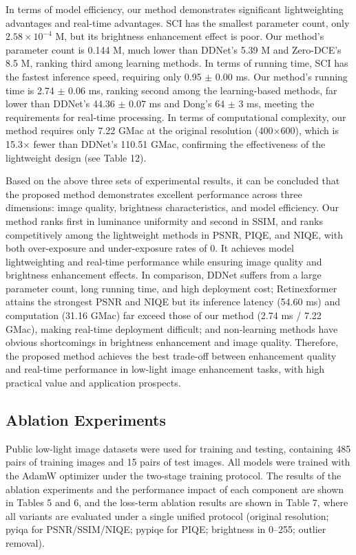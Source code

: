 \documentclass[sensors,article,submit,moreauthors]{Definitions/mdpi}
\begin{document}
In terms of model efficiency, our method demonstrates significant lightweighting advantages and real-time advantages. SCI has the smallest parameter count, only $2.58\times10^{-4}$ M, but its brightness enhancement effect is poor. Our method's parameter count is 0.144 M, much lower than DDNet's 5.39 M and Zero-DCE's 8.5 M, ranking third among learning methods. In terms of running time, SCI has the fastest inference speed, requiring only 0.95 $\pm$ 0.00 ms. Our method's running time is 2.74 $\pm$ 0.06 ms, ranking second among the learning-based methods, far lower than DDNet's 44.36 $\pm$ 0.07 ms and Dong's 64 $\pm$ 3 ms, meeting the requirements for real-time processing. In terms of computational complexity, our method requires only 7.22 GMac at the original resolution (400$\times$600), which is 15.3$\times$ fewer than DDNet's 110.51 GMac, confirming the effectiveness of the lightweight design (see Table 12).

Based on the above three sets of experimental results, it can be concluded that the proposed method demonstrates excellent performance across three dimensions: image quality, brightness characteristics, and model efficiency. Our method ranks first in luminance uniformity and second in SSIM, and ranks competitively among the lightweight methods in PSNR, PIQE, and NIQE, with both over-exposure and under-exposure rates of 0. It achieves model lightweighting and real-time performance while ensuring image quality and brightness enhancement effects. In comparison, DDNet suffers from a large parameter count, long running time, and high deployment cost; Retinexformer attains the strongest PSNR and NIQE but its inference latency (54.60 ms) and computation (31.16 GMac) far exceed those of our method (2.74 ms / 7.22 GMac), making real-time deployment difficult; and non-learning methods have obvious shortcomings in brightness enhancement and image quality. Therefore, the proposed method achieves the best trade-off between enhancement quality and real-time performance in low-light image enhancement tasks, with high practical value and application prospects.

\subsection{Ablation Experiments}

Public low-light image datasets were used for training and testing, containing 485 pairs of training images and 15 pairs of test images. All models were trained with the AdamW optimizer under the two-stage training protocol. The results of the ablation experiments and the performance impact of each component are shown in Tables 5 and 6, and the loss-term ablation results are shown in Table 7, where all variants are evaluated under a single unified protocol (original resolution; pyiqa for PSNR/SSIM/NIQE; pypiqe for PIQE; brightness in 0--255; outlier removal).
\end{document}

